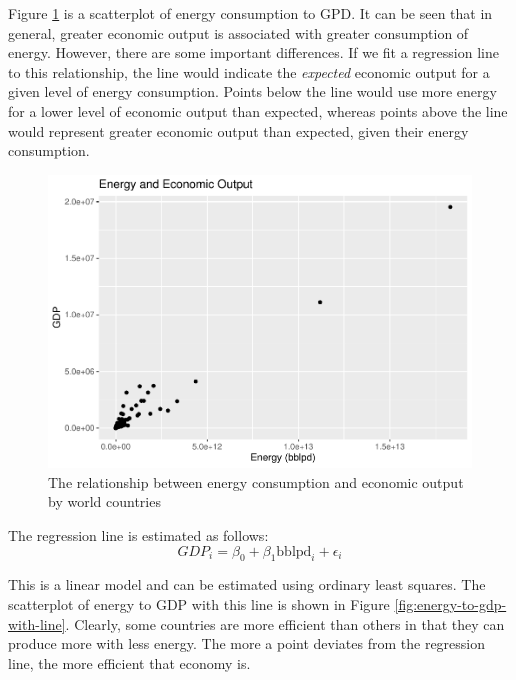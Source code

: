\documentclass[]{elsarticle} %
\makeatletter
\def\maxwidth{\ifdim\Gin@nat@width>\linewidth\linewidth
\else\Gin@nat@width\fi}
\let\Oldincludegraphics\includegraphics
\renewcommand{\includegraphics}[1]{\Oldincludegraphics[width=\maxwidth]{#1}}
\makeatother
\begin{document}
Figure \ref{fig:energy-to-gdp} is a scatterplot of energy consumption to
GPD. It can be seen that in general, greater economic output is
associated with greater consumption of energy. However, there are some
important differences. If we fit a regression line to this relationship,
the line would indicate the \emph{expected} economic output for a given
level of energy consumption. Points below the line would use more energy
for a lower level of economic output than expected, whereas points above
the line would represent greater economic output than expected, given
their energy consumption.

\begin{figure}
\centering
\includegraphics{Elsevier-Template_files/figure-latex/fig-energy-to-gdp-1.pdf}
\caption{\label{fig:energy-to-gdp} The relationship between energy
consumption and economic output by world countries}
\end{figure}

The regression line is estimated as follows: \[
GDP_i = \beta_0 + \beta_1\text{bblpd}_i + \epsilon_i
\]

This is a linear model and can be estimated using ordinary least
squares. The scatterplot of energy to GDP with this line is shown in
Figure \ref{fig:energy-to-gdp-with-line}. Clearly, some countries are
more efficient than others in that they can produce more with less
energy. The more a point deviates from the regression line, the more
efficient that economy is.
\end{document}
